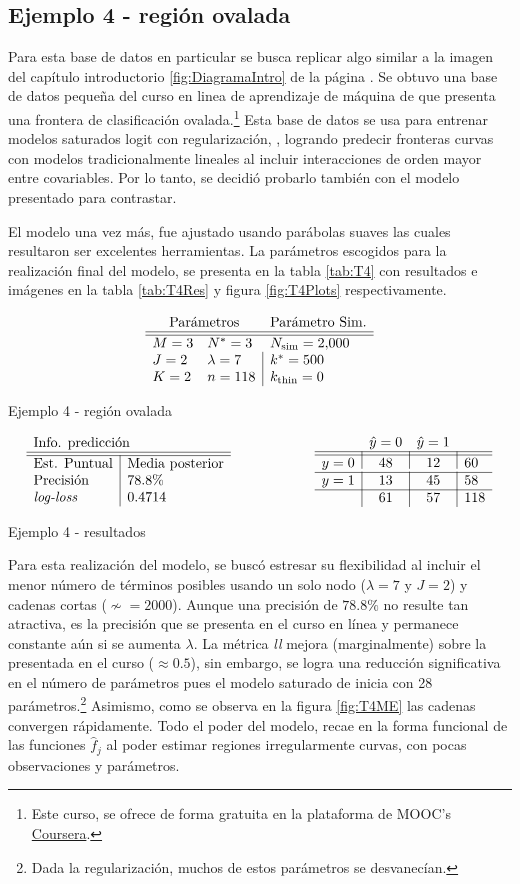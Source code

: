 \documentclass[../Main/Main.tex]{subfiles}
\begin{document}
\subsection*{Ejemplo 4 - región ovalada}
Para esta base de datos en particular se busca replicar algo similar a la imagen del capítulo introductorio \ref{fig:DiagramaIntro} de la página \pageref{fig:DiagramaIntro}. Se obtuvo una base de datos pequeña del curso en linea de aprendizaje de máquina de \citet{andrew2018ml} que presenta una frontera de clasificación ovalada.\footnote{Este curso, se ofrece de forma gratuita en la plataforma de MOOC's \href{https://www.coursera.org/learn/machine-learning}{Coursera}.} Esta base de datos se usa para entrenar modelos saturados logit con regularización, \citet{hastie2008elements}, logrando predecir fronteras curvas con modelos tradicionalmente lineales al incluir interacciones de orden mayor entre covariables. Por lo tanto, se decidió probarlo también con el modelo presentado para contrastar.

El modelo una vez más, fue ajustado usando parábolas suaves las cuales resultaron ser excelentes herramientas. La parámetros escogidos para la realización final del modelo, se presenta en la tabla \ref{tab:T4} con resultados e imágenes en la tabla \ref{tab:T4Res} y figura \ref{fig:T4Plots} respectivamente.  
\begin{table}[h]
$$\paramsmod{3}{2}{2}{3}{7}{118}{\num{2000}}{500}{0}$$
\caption{Ejemplo 4 - región ovalada}
\label{tab:T4}
\end{table}

\begin{table}[h]
\begin{align*}
\resultados{\text{Media posterior}}{78.8}{0.4714}
\qquad\qquad\qquad
\matconf{48}{12}{60}{13}{45}{58}{61}{57}{118}
\end{align*}
\caption{Ejemplo 4 - resultados}
\label{tab:T4Res}
\end{table}

Para esta realización del modelo, se buscó estresar su flexibilidad al incluir el menor número de términos posibles usando un solo nodo ($\lambda = 7$ y $J = 2$) y cadenas cortas ($\nsim = \num{2000}$). Aunque una precisión de $78.8\%$ no resulte tan atractiva, es la precisión que se presenta en el curso en línea y permanece constante aún si se aumenta $\lambda$. La métrica \textit{ll} mejora (marginalmente) sobre la presentada en el curso ($\approx0.5$), sin embargo, se logra una reducción significativa en el número de parámetros pues el modelo saturado de \citet{andrew2018ml} inicia con 28 parámetros.\footnote{Dada la regularización, muchos de estos parámetros se desvanecían.} Asimismo, como se observa en la figura \ref{fig:T4ME} las cadenas convergen rápidamente. Todo el poder del modelo, recae en la forma funcional de las funciones $\hat{f}_j$ al poder estimar regiones irregularmente curvas, con pocas observaciones y parámetros. 
\end{document}
